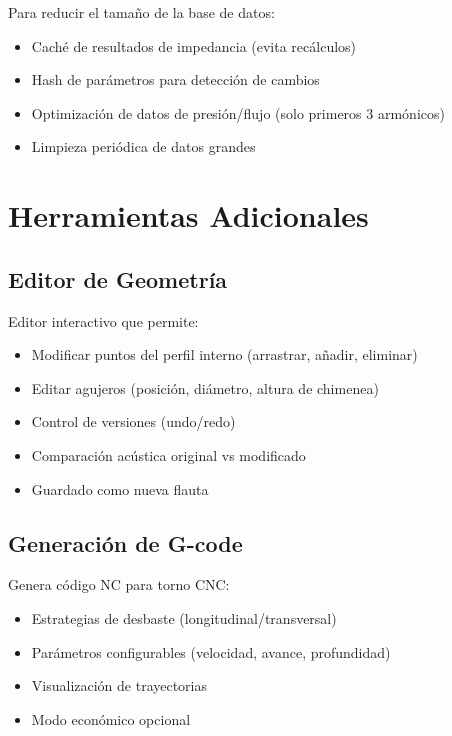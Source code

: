 \documentclass[12pt,a4paper,twocolumn]{article}
\begin{document}
Para reducir el tamaño de la base de datos:

\begin{itemize}
    \item Caché de resultados de impedancia (evita recálculos)
    \item Hash de parámetros para detección de cambios
    \item Optimización de datos de presión/flujo (solo primeros 3 armónicos)
    \item Limpieza periódica de datos grandes
\end{itemize}

\section{Herramientas Adicionales}

\subsection{Editor de Geometría}

Editor interactivo que permite:
\begin{itemize}
    \item Modificar puntos del perfil interno (arrastrar, añadir, eliminar)
    \item Editar agujeros (posición, diámetro, altura de chimenea)
    \item Control de versiones (undo/redo)
    \item Comparación acústica original vs modificado
    \item Guardado como nueva flauta
\end{itemize}

\subsection{Generación de G-code}

Genera código NC para torno CNC:
\begin{itemize}
    \item Estrategias de desbaste (longitudinal/transversal)
    \item Parámetros configurables (velocidad, avance, profundidad)
    \item Visualización de trayectorias
    \item Modo económico opcional
\end{itemize}
\end{document}
